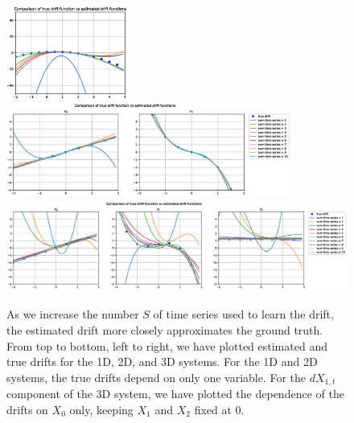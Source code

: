 \documentclass{article}
\begin{document}
\begin{figure}[th]
\begin{center}
\includegraphics[height=1.2in]{../1dcode/varying_num_timeseries/plots/drift_comparison.eps} \includegraphics[height=1.2in]{../2dcode/varying_num_timeseries/plots/drift_comparison.eps}\\
\includegraphics[height=1.2in]{../3ddampedduffing/varying_num_timeseries/plots/drift_comparison.eps}
\end{center}
\caption{As we increase the number $S$ of time series used to learn the drift,
the estimated drift more closely approximates the ground truth.  From top to bottom, left to right, we have plotted estimated and true drifts for the 1D, 2D, and 3D systems.  For the 1D and 2D systems, the true drifts depend on only one variable.  For the $dX_{1,t}$ component of the 3D system, we have plotted the dependence of the drifts on $X_0$ only, keeping $X_1$ and $X_2$ fixed at $0$.}
\label{fig:exp1drift}
\end{figure}
\end{document}
